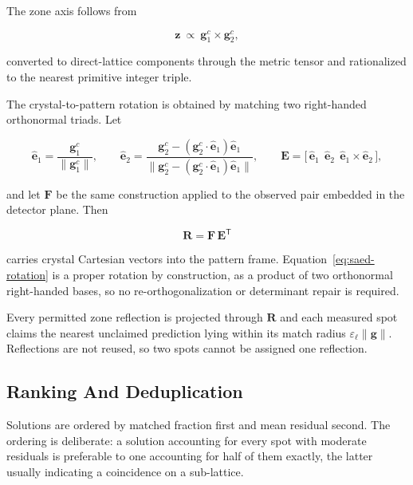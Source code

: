The zone axis follows from

\begin{equation}
\mathbf{z} \ \propto\ \mathbf{g}^{c}_{1} \times \mathbf{g}^{c}_{2},
\end{equation}

converted to direct-lattice components through the metric tensor and rationalized to the nearest
primitive integer triple.

The crystal-to-pattern rotation is obtained by matching two right-handed orthonormal triads. Let

\begin{equation}
\hat{\mathbf{e}}_{1} = \frac{\mathbf{g}^{c}_{1}}{\lVert \mathbf{g}^{c}_{1} \rVert},
\qquad
\hat{\mathbf{e}}_{2} = \frac{\mathbf{g}^{c}_{2}
- \left( \mathbf{g}^{c}_{2} \cdot \hat{\mathbf{e}}_{1} \right) \hat{\mathbf{e}}_{1}}
{\bigl\lVert \mathbf{g}^{c}_{2}
- \left( \mathbf{g}^{c}_{2} \cdot \hat{\mathbf{e}}_{1} \right) \hat{\mathbf{e}}_{1} \bigr\rVert},
\qquad
\mathbf{E} = \bigl[\, \hat{\mathbf{e}}_{1} \ \ \hat{\mathbf{e}}_{2} \ \
\hat{\mathbf{e}}_{1} \times \hat{\mathbf{e}}_{2} \,\bigr],
\end{equation}

and let $\mathbf{F}$ be the same construction applied to the observed pair embedded in the
detector plane. Then

\begin{equation}
\mathbf{R} = \mathbf{F}\,\mathbf{E}^{\mathsf{T}}
\label{eq:saed-rotation}
\end{equation}

carries crystal Cartesian vectors into the pattern frame. Equation~\eqref{eq:saed-rotation} is a
proper rotation by construction, as a product of two orthonormal right-handed bases, so no
re-orthogonalization or determinant repair is required.

Every permitted zone reflection is projected through $\mathbf{R}$ and each measured spot claims
the nearest unclaimed prediction lying within its match radius
$\varepsilon_{\ell}\lVert\mathbf{g}\rVert$. Reflections are not reused, so two spots cannot be
assigned one reflection.

\subsection{Ranking And Deduplication}

Solutions are ordered by matched fraction first and mean residual second. The ordering is
deliberate: a solution accounting for every spot with moderate residuals is preferable to one
accounting for half of them exactly, the latter usually indicating a coincidence on a sub-lattice.

